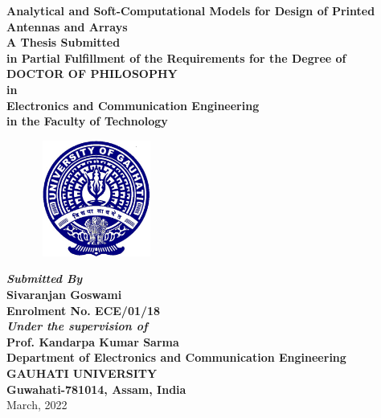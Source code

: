 \begin{titlepage}
\begin{center}
{\Large \bf Analytical and Soft-Computational Models for Design of Printed Antennas and Arrays} \\ [5ex]


{\normalsize{ \textbf{A Thesis Submitted \\in
 Partial Fulfillment of the Requirements for the Degree of \\\large \bf
DOCTOR OF PHILOSOPHY\\
in \\
Electronics and Communication Engineering \\
in the Faculty of Technology}}}\\
[6ex] 

\begin{figure}[h]
\centering
\includegraphics[width=1.5in,height=1.5in]{clogoe.eps}\\
\end{figure}

{\sl \textbf{Submitted By}} \\[2ex]
{\sf \sf \textbf{Sivaranjan Goswami\\
Enrolment No. ECE/01/18}}\\[4ex]
{\sl \textbf{Under the supervision of}} \\[2ex]
{\sf \sf \textbf{Prof. Kandarpa Kumar Sarma}}\\ [6ex]


\vspace{0.5in}
{\large \bf Department of Electronics and Communication Engineering}  \\[1ex]
{\large \bf{GAUHATI UNIVERSITY}} \\[1ex]
{\large \bf{Guwahati-781014, Assam, India}} \\[1ex]
{\normalsize March, 2022 }
\end{center}
\end{titlepage}
